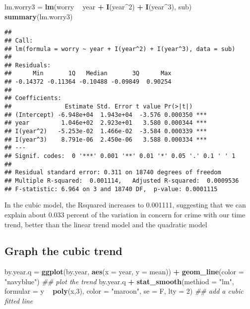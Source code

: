 \documentclass[]{article}
\newenvironment{Shaded}{\begin{snugshade}}{\end{snugshade}}
\newcommand{\CommentTok}[1]{\textcolor[rgb]{0.56,0.35,0.01}{\textit{#1}}}
\newcommand{\DataTypeTok}[1]{\textcolor[rgb]{0.13,0.29,0.53}{#1}}
\newcommand{\DecValTok}[1]{\textcolor[rgb]{0.00,0.00,0.81}{#1}}
\newcommand{\KeywordTok}[1]{\textcolor[rgb]{0.13,0.29,0.53}{\textbf{#1}}}
\newcommand{\NormalTok}[1]{#1}
\newcommand{\OperatorTok}[1]{\textcolor[rgb]{0.81,0.36,0.00}{\textbf{#1}}}
\newcommand{\StringTok}[1]{\textcolor[rgb]{0.31,0.60,0.02}{#1}}
\begin{document}
\begin{Shaded}
\begin{Highlighting}[]
\NormalTok{lm.worry3 =}\StringTok{ }\KeywordTok{lm}\NormalTok{(worry }\OperatorTok{~}\StringTok{ }\NormalTok{year }\OperatorTok{+}\StringTok{ }\KeywordTok{I}\NormalTok{(year}\OperatorTok{^}\DecValTok{2}\NormalTok{) }\OperatorTok{+}\StringTok{ }\KeywordTok{I}\NormalTok{(year}\OperatorTok{^}\DecValTok{3}\NormalTok{), sub)}
\KeywordTok{summary}\NormalTok{(lm.worry3)}
\end{Highlighting}
\end{Shaded}

\begin{verbatim}
## 
## Call:
## lm(formula = worry ~ year + I(year^2) + I(year^3), data = sub)
## 
## Residuals:
##      Min       1Q   Median       3Q      Max 
## -0.14372 -0.11364 -0.10488 -0.09849  0.90254 
## 
## Coefficients:
##               Estimate Std. Error t value Pr(>|t|)    
## (Intercept) -6.948e+04  1.943e+04  -3.576 0.000350 ***
## year         1.046e+02  2.923e+01   3.580 0.000344 ***
## I(year^2)   -5.253e-02  1.466e-02  -3.584 0.000339 ***
## I(year^3)    8.791e-06  2.450e-06   3.588 0.000334 ***
## ---
## Signif. codes:  0 '***' 0.001 '**' 0.01 '*' 0.05 '.' 0.1 ' ' 1
## 
## Residual standard error: 0.311 on 18740 degrees of freedom
## Multiple R-squared:  0.001114,   Adjusted R-squared:  0.0009536 
## F-statistic: 6.964 on 3 and 18740 DF,  p-value: 0.0001115
\end{verbatim}

In the cubic model, the Rsquared increases to 0.001111, suggesting that
we can explain about 0.033 percent of the variation in concern for crime
with our time trend, better than the linear trend model and the
quadratic model

\hypertarget{graph-the-cubic-trend}{%
\subsection{Graph the cubic trend}\label{graph-the-cubic-trend}}

\begin{Shaded}
\begin{Highlighting}[]
\NormalTok{by.year.q =}\StringTok{ }\KeywordTok{ggplot}\NormalTok{(by.year, }\KeywordTok{aes}\NormalTok{(}\DataTypeTok{x =}\NormalTok{ year, }\DataTypeTok{y =}\NormalTok{ mean)) }\OperatorTok{+}\StringTok{ }\KeywordTok{geom_line}\NormalTok{(}\DataTypeTok{color =} \StringTok{"navyblue"}\NormalTok{) }\CommentTok{## plot the trend}
\NormalTok{by.year.q }\OperatorTok{+}\StringTok{ }\KeywordTok{stat_smooth}\NormalTok{(}\DataTypeTok{methiod =} \StringTok{"lm"}\NormalTok{, }\DataTypeTok{formular =}\NormalTok{ y }\OperatorTok{~}\StringTok{ }\KeywordTok{poly}\NormalTok{(x,}\DecValTok{3}\NormalTok{), }\DataTypeTok{color =} \StringTok{"maroon"}\NormalTok{, }\DataTypeTok{se =}\NormalTok{ F, }\DataTypeTok{lty =} \DecValTok{2}\NormalTok{) }\CommentTok{## add a cubic fitted line}
\end{Highlighting}
\end{Shaded}
\end{document}
